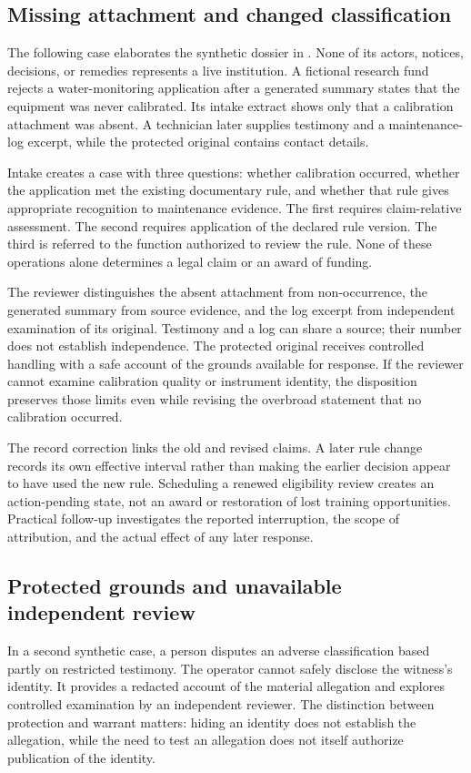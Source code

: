 \documentclass[11pt,a4paper]{article}
\begin{document}
\subsection{Missing attachment and changed classification}
The following case elaborates the synthetic dossier in . None of its actors, notices, decisions, or remedies represents a live institution. A fictional research fund rejects a water-monitoring application after a generated summary states that the equipment was never calibrated. Its intake extract shows only that a calibration attachment was absent. A technician later supplies testimony and a maintenance-log excerpt, while the protected original contains contact details.

Intake creates a case with three questions: whether calibration occurred, whether the application met the existing documentary rule, and whether that rule gives appropriate recognition to maintenance evidence. The first requires claim-relative assessment. The second requires application of the declared rule version. The third is referred to the function authorized to review the rule. None of these operations alone determines a legal claim or an award of funding.

The reviewer distinguishes the absent attachment from non-occurrence, the generated summary from source evidence, and the log excerpt from independent examination of its original. Testimony and a log can share a source; their number does not establish independence. The protected original receives controlled handling with a safe account of the grounds available for response. If the reviewer cannot examine calibration quality or instrument identity, the disposition preserves those limits even while revising the overbroad statement that no calibration occurred.

The record correction links the old and revised claims. A later rule change records its own effective interval rather than making the earlier decision appear to have used the new rule. Scheduling a renewed eligibility review creates an action-pending state, not an award or restoration of lost training opportunities. Practical follow-up investigates the reported interruption, the scope of attribution, and the actual effect of any later response.

\subsection{Protected grounds and unavailable independent review}
In a second synthetic case, a person disputes an adverse classification based partly on restricted testimony. The operator cannot safely disclose the witness's identity. It provides a redacted account of the material allegation and explores controlled examination by an independent reviewer. The distinction between protection and warrant matters: hiding an identity does not establish the allegation, while the need to test an allegation does not itself authorize publication of the identity.
\end{document}
